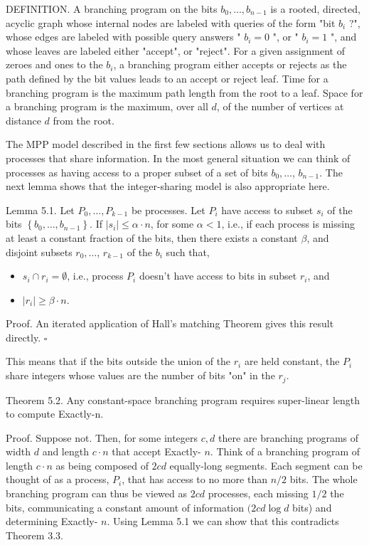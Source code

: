 \documentclass[10pt]{article}
\begin{document}
DEFINITION. A branching program on the bits $b_{0}, \ldots, b_{n-1}$ is a rooted, directed, acyclic graph whose internal nodes are labeled with queries of the form "bit $b_{i}$ ?", whose edges are labeled with possible query answers " $b_{i}=0$ ", or " $b_{i}=1$ ", and whose leaves are labeled either "accept", or "reject". For a given assignment of zeroes and ones to the $b_{i}$, a branching program either accepts or rejects as the path defined by the bit values leads to an accept or reject leaf. Time for a branching program is the maximum path length from the root to a leaf. Space for a branching program is the maximum, over all $d$, of the number of vertices at distance $d$ from the root.

The MPP model described in the first few sections allows us to deal with processes that share information. In the most general situation we can think of processes as having access to a proper subset of a set of bits $b_{0}, \ldots$, $b_{n-1}$. The next lemma shows that the integer-sharing model is also appropriate here.

Lemma 5.1. Let $P_{0}, \ldots, P_{k-1}$ be processes. Let $P_{i}$ have access to subset $s_{i}$ of the bits $\left\{b_{0}, \ldots, b_{n-1}\right\}$. If $\left|s_{i}\right| \leq \alpha \cdot n$, for some $\alpha<1$, i.e., if each process is missing at least a constant fraction of the bits, then there exists a constant $\beta$, and disjoint subsets $r_{0}, \ldots$, $r_{k-1}$ of the $b_{i}$ such that,

\begin{itemize}
  \item[(i)] $s_{i} \cap r_{i}=\emptyset$, i.e., process $P_{i}$ doesn't have access to bits in subset $r_{i}$, and
  \item[(ii)] $\left|r_{i}\right| \geq \beta \cdot n$.
\end{itemize}

Proof. An iterated application of Hall's matching Theorem gives this result directly. \(\square\)

This means that if the bits outside the union of the $r_{i}$ are held constant, the $P_{i}$ share integers whose values are the number of bits "on" in the $r_{j}$.

Theorem 5.2. Any constant-space branching program requires super-linear length to compute Exactly-n.

Proof. Suppose not. Then, for some integers $c, d$ there are branching programs of width $d$ and length $c \cdot n$ that accept Exactly- $n$. Think of a branching program of length $c \cdot n$ as being composed of $2 c d$ equally-long segments. Each segment can be thought of as a process, $P_{i}$, that has access to no more than $n / 2$ bits. The whole branching program can thus be viewed as $2 c d$ processes, each missing $1 / 2$ the bits, communicating a constant amount of information $(2 c d \log d$ bits) and determining Exactly- $n$. Using Lemma 5.1 we can show that this contradicts Theorem 3.3.
\end{document}
